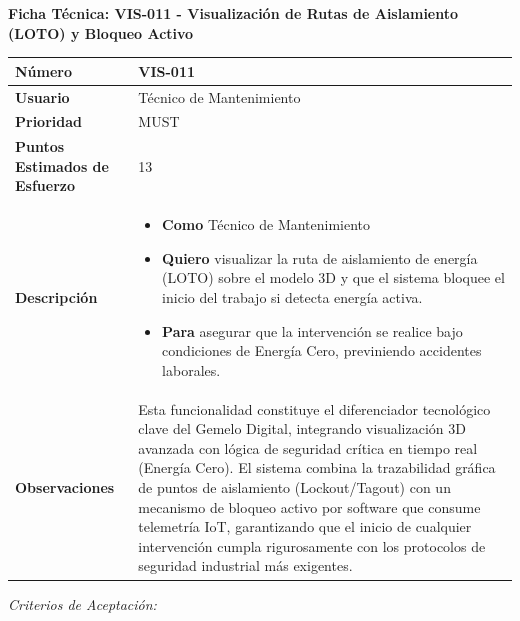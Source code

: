 \vspace{1em}
\noindent\textbf{Ficha Técnica: VIS-011 - Visualización de Rutas de Aislamiento (LOTO) y Bloqueo Activo}
\footnotesize\setlength{\tabcolsep}{4pt}\renewcommand{\arraystretch}{1.2}
\begin{longtable}{|p{0.21\textwidth}|p{0.74\textwidth}|}\hline
\textbf{Número} & VIS-011 \\ \hline
\textbf{Usuario} & Técnico de Mantenimiento \\ \hline
\textbf{Prioridad} & MUST \\ \hline
\textbf{Puntos Estimados de Esfuerzo} & 13 \\ \hline
\textbf{Descripción} & \parbox[t]{\linewidth}{\vspace{2pt}\begin{itemize}[leftmargin=1.5em, nosep, topsep=0pt]
\item \textbf{Como} Técnico de Mantenimiento
\item \textbf{Quiero} visualizar la ruta de aislamiento de energía (LOTO) sobre el modelo 3D y que el sistema bloquee el inicio del trabajo si detecta energía activa.
\item \textbf{Para} asegurar que la intervención se realice bajo condiciones de Energía Cero, previniendo accidentes laborales.
\end{itemize}\vspace{2pt}} \\ \hline
\textbf{Observaciones} & Esta funcionalidad constituye el diferenciador tecnológico clave del Gemelo Digital, integrando visualización 3D avanzada con lógica de seguridad crítica en tiempo real (Energía Cero). El sistema combina la trazabilidad gráfica de puntos de aislamiento (Lockout/Tagout) con un mecanismo de bloqueo activo por software que consume telemetría IoT, garantizando que el inicio de cualquier intervención cumpla rigurosamente con los protocolos de seguridad industrial más exigentes. \\ \hline
\end{longtable}\normalsize
\noindent\textit{Criterios de Aceptación:}
